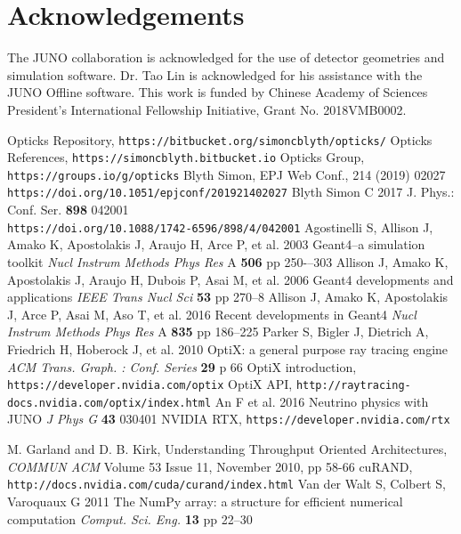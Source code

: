 \documentclass{webofc}
\begin{document}
\section*{Acknowledgements}
%
The JUNO collaboration is acknowledged for the use of detector 
geometries and simulation software. Dr. Tao Lin is acknowledged for his assistance with 
the JUNO Offline software. 
This work is funded by Chinese Academy of Sciences President’s International Fellowship Initiative,
Grant No. 2018VMB0002.
%
%
\newpage
\begin{thebibliography}{}
%
Opticks Repository, {\tt https://bitbucket.org/simoncblyth/opticks/}
Opticks References, {\tt https://simoncblyth.bitbucket.io}
Opticks Group, {\tt https://groups.io/g/opticks}
Blyth Simon, EPJ Web Conf., 214 (2019) 02027 \\
{\tt https://doi.org/10.1051/epjconf/201921402027}
Blyth Simon C 2017 J. Phys.: Conf. Ser. {\bf 898} 042001 \\
{\tt https://doi.org/10.1088/1742-6596/898/4/042001}
%
%
%
Agostinelli S, Allison J, Amako K, Apostolakis J, Araujo H, Arce P, et al.
2003
Geant4--a simulation toolkit
{\it Nucl Instrum Methods Phys Res} A {\bf 506} pp 250-–303
Allison J, Amako K, Apostolakis J, Araujo H, Dubois P, Asai M, et al.
2006
Geant4 developments and applications
{\it IEEE Trans Nucl Sci} {\bf 53} pp 270--8
Allison J, Amako K, Apostolakis J, Arce P, Asai M, Aso T, et al.
2016
Recent developments in Geant4
{\it Nucl Instrum Methods Phys Res} A {\bf 835} pp 186--225
%
%
%
%
Parker S, Bigler J, Dietrich A, Friedrich H, Hoberock J, et al.
2010
OptiX: a general purpose ray tracing engine
{\it ACM Trans. Graph. : Conf. Series} {\bf 29} p 66
OptiX introduction, {\tt https://developer.nvidia.com/optix}
OptiX API, {\tt http://raytracing-docs.nvidia.com/optix/index.html}
An F et al.
2016
Neutrino physics with JUNO
{\it J Phys G} {\bf 43} 030401
NVIDIA RTX, {\tt https://developer.nvidia.com/rtx}



M. Garland and D. B. Kirk, Understanding Throughput Oriented Architectures, 
{\it COMMUN ACM} Volume 53 Issue 11, November 2010, pp 58-66  	
cuRAND, {\tt http://docs.nvidia.com/cuda/curand/index.html}
Van der Walt S, Colbert S, Varoquaux G 
2011 
The NumPy array: a structure for efficient numerical computation
{\it Comput. Sci. Eng.} {\bf 13} pp 22--30
%
\end{thebibliography}
%
\end{document}
